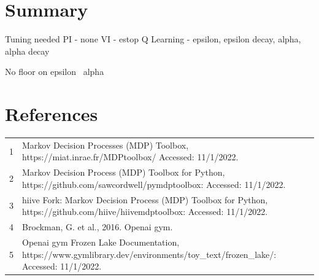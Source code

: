 \documentclass[letterpaper]{article} %
\begin{document}
\section{Summary}
Tuning needed
PI - none
VI - estop
Q Learning - epsilon, epsilon decay, alpha, alpha decay

No floor on epsilon \ alpha

\section{References}
\begin{tabular}{l p{2.75in}}
\\
1 & Markov Decision Processes (MDP) Toolbox, https://miat.inrae.fr/MDPtoolbox/ Accessed: 11/1/2022.
\\
2 & Markov Decision Process (MDP) Toolbox for Python, https://github.com/sawcordwell/pymdptoolbox: Accessed: 11/1/2022.
\\
3 & hiive Fork: Markov Decision Process (MDP) Toolbox for Python, https://github.com/hiive/hiivemdptoolbox: Accessed: 11/1/2022.
\\
4 & Brockman, G. et al., 2016. Openai gym.
\\
5 & Openai gym Frozen Lake Documentation,  https://www.gymlibrary.dev/environments/toy\_text/frozen\_lake/: Accessed: 11/1/2022.

\end{tabular}
\end{document}
